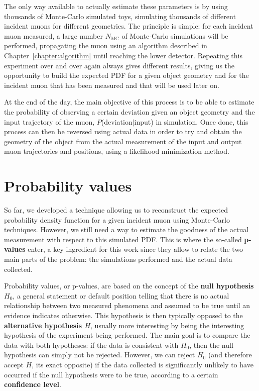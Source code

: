 \documentclass[a4paper, 11pt, twoside, openright]{report}
\begin{document}
The only way available to actually estimate these parameters is by using thousands of Monte-Carlo simulated toys, simulating thousands of different incident muons for different geometries. The principle is simple: for each incident muon measured, a large number $N_{\text{MC}}$ of Monte-Carlo simulations will be performed, propagating the muon using an algorithm described in Chapter~\ref{chapter:algorithm} until reaching the lower detector. Repeating this experiment over and over again always gives different results, giving us the opportunity to build the expected PDF for a given object geometry and for the incident muon that has been measured and that will be used later on.

At the end of the day, the main objective of this process is to be able to estimate the probability of observing a certain deviation given an object geometry and the input trajectory of the muon, $P$(deviation$|$input) in simulation. Once done, this process can then be reversed using actual data in order to try and obtain the geometry of the object from the actual measurement of the input and output muon trajectories and positions, using a likelihood minimization method.

\section{Probability values} \label{sec:pValues}

So far, we developed a technique allowing us to reconstruct the expected probability density function for a given incident muon using Monte-Carlo techniques. However, we still need a way to estimate the goodness of the actual measurement with respect to this simulated PDF. This is where the so-called \textbf{p-values} enter, a key ingredient for this work since they allow to relate the two main parts of the problem: the simulations performed and the actual data collected.

Probability values, or p-values, are based on the concept of the \textbf{null hypothesis $H_0$}, a general statement or default position telling that there is no actual relationship between two measured phenomena and assumed to be true until an evidence indicates otherwise. This hypothesis is then typically opposed to the \textbf{alternative hypothesis $H$}, usually more interesting by being the interesting hypothesis of the experiment being performed. The main goal is to compare the data with both hypotheses: if the data is consistent with $H_0$, then the null hypothesis can simply not be rejected. However, we can reject $H_0$ (and therefore accept $H$, its exact opposite) if the data collected is significantly unlikely to have occurred if the null hypothesis were to be true, according to a certain \textbf{confidence level}.
\end{document}
